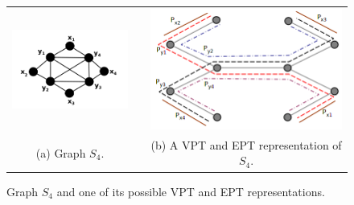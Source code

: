 \begin{figure}[h]
  \centering
  \begin{tabular}{ c p{0.7cm} c }
    \centering
    \includegraphics[width=5cm]{img/s4.png} & &
    \includegraphics[width=8cm]{img/s4eptRepresentation.png}
    \\
    \footnotesize \centering 
    (a)  \footnotesize Graph $S_4$. &&  \footnotesize (b) A VPT and EPT representation of $S_{4}$. \\

  \end{tabular}

 \caption{Graph $S_4$ and one of its possible VPT and EPT representations.}
 \label{fig:exemplos}
\end{figure} 
